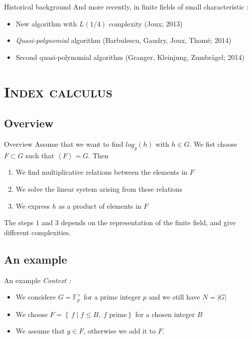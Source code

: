 \documentclass[xcolor=x11names,compress]{beamer}
\theoremstyle{break}
\theoremstyle{sc}
\theoremstyle{definition}
\theoremstyle{remark}
\begin{document}
\begin{frame}{Historical background}
  And more recently, in finite fields of small characteristic :
  \begin{itemize}
    \item New algorithm with $L(1/4)$ complexity (Joux; 2013)
    \item \emph{Quasi-polynomial} algorithm (Barbulescu, Gaudry, Joux, Thomé; 2014)
    \item Second quasi-polynomial algorithm (Granger, Kleinjung, Zumbrägel; 2014)
  \end{itemize}
\end{frame}

\section{\scshape Index calculus}
\subsection{Overview}
\begin{frame}{Overview}
  Assume that we want to find $log_g(h)$ with $h\in G$. We fist choose $F\subset
  G$ such that $\left\langle F \right\rangle = G$. Then
  \begin{enumerate}
    \item We find multiplicative relations between the elements in $F$
    \item We solve the linear system arising from these relations
    \item We express $h$ as a product of elements in $F$
  \end{enumerate}
  The steps $1$ and $3$ depends on the representation of the finite field, and
  give different complexities.
\end{frame}

\subsection{An example}
\begin{frame}{An example}
  \emph{Context :}
  \begin{itemize}
    \item We considere $G = \mathbb{F}_p^\times$ for a prime integer $p$ and we
      still have $N = |G|$
    \item We choose $F = \left\{\, f \;|\; f \leq B,\; f \text{ prime}
    \right\}$ for a chosen integer $B$
  \item We assume that $g\in F$, otherwise we add it to $F$.
  \end{itemize}
\end{frame}
\end{document}
